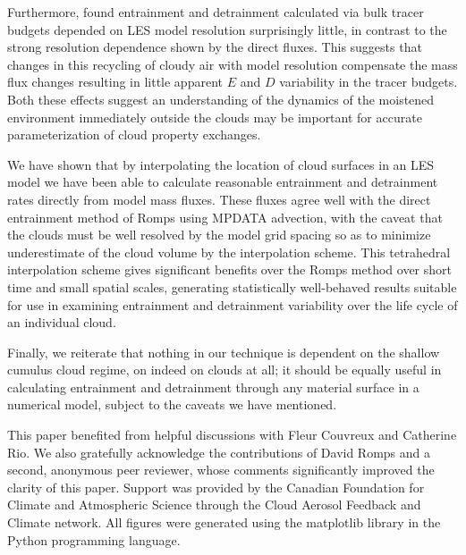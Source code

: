 \documentclass[12pt]{article}
\begin{document}
Furthermore, \cite{Brown1999} found entrainment and detrainment calculated via
bulk tracer budgets depended on LES model resolution surprisingly little, in 
contrast to the strong resolution dependence shown by the direct fluxes.
This suggests that changes in this recycling of cloudy air with model 
resolution compensate the mass flux changes resulting in little apparent $E$ 
and $D$ variability in the tracer budgets.  Both these effects suggest an 
understanding of the dynamics of the moistened environment immediately outside 
the clouds may be important for accurate parameterization of cloud property 
exchanges.

We have shown that by interpolating the location of cloud surfaces in an LES
model we have been able to calculate reasonable entrainment and detrainment 
rates directly from model mass fluxes.  These fluxes agree well with the 
direct entrainment method of Romps using MPDATA advection, with the caveat that 
the clouds must be well resolved by the model grid spacing so as to minimize 
underestimate of the cloud volume by the interpolation scheme.  This 
tetrahedral interpolation scheme gives significant benefits over the Romps 
method over short time and small spatial scales, generating statistically 
well-behaved results suitable for use in examining entrainment and detrainment 
variability over the life cycle of an individual cloud.

Finally, we reiterate that nothing in our technique is dependent on the shallow 
cumulus cloud regime, on indeed on clouds at all; it should be equally useful
in calculating entrainment and detrainment through any material surface in a 
numerical model, subject to the caveats we have mentioned.



\begin{acknowledgment}
This paper benefited from helpful discussions with Fleur Couvreux and 
Catherine Rio.  We also gratefully acknowledge the contributions of David 
Romps and a second, anonymous peer reviewer, whose comments significantly 
improved the clarity of this paper.  Support was provided by the Canadian 
Foundation for Climate and Atmospheric Science through the Cloud Aerosol 
Feedback and Climate network.  All figures were generated using the matplotlib 
library in the Python programming language.
\end{acknowledgment}

\end{document}
